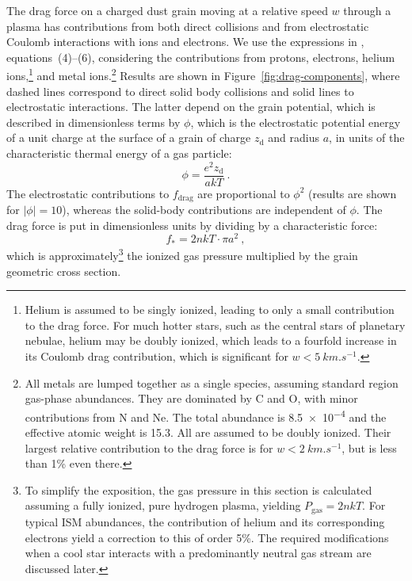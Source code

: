 \message{ !name(dusty-bow-wave.tex)}\documentclass[useAMS, usenatbib, a4paper]{mnras}
\providecommand{\abs}[1]{\lvert#1\rvert}
\newcommand{\grain}{\ensuremath{_{\text{d}}}}
\newcommand\drag{\ensuremath{_{\text{drag}}}}
\newcommand{\gas}{\ensuremath{_{\text{gas}}}}
\begin{document}
The drag force on a charged dust grain moving at a relative speed
\(w\) through a plasma has contributions from both direct collisions
and from electrostatic Coulomb interactions with ions and electrons.
We use the expressions in \citet{Draine:1979a}, equations~(4)--(6),
considering the contributions from protons, electrons, helium
ions,\footnote{Helium is assumed to be singly ionized, leading to only
  a small contribution to the drag force.  For much hotter stars, such
  as the central stars of planetary nebulae, helium may be doubly
  ionized, which leads to a fourfold increase in its Coulomb drag
  contribution, which is significant for \(w < \SI{5}{km.s^{-1}}\).} %
and metal ions.\footnote{%
  \label{fn:metal-drag}
  All metals are lumped together as a single species, assuming
  standard \hii{} region gas-phase abundances.  They are dominated by
  C and O, with minor contributions from N and Ne.  The total
  abundance is \num{8.5e-4} and the effective atomic weight is
  \num{15.3}.  All are assumed to be doubly ionized.  Their largest
  relative contribution to the drag force is for
  \(w < \SI{2}{km.s^{-1}}\), but is less than 1\% even there.} %
Results are shown in Figure~\ref{fig:drag-components}, where dashed
lines correspond to direct solid body collisions and solid lines to
electrostatic interactions.  The latter depend on the grain potential,
which is described in dimensionless terms by \(\phi\), which is the
electrostatic potential energy of a unit charge at the surface of a
grain of charge \(z\grain\) and radius \(a\), in units of the
characteristic thermal energy of a gas particle:
\begin{equation}
  \label{eq:phi-potential}
  \phi = \frac{e^2 z\grain}{a kT} \ .
\end{equation}
The electrostatic contributions to \(f\drag\) are proportional to
\(\phi^2\) (results are shown for \(\abs{\phi} = 10\)), whereas the
solid-body contributions are independent of \(\phi\).  The drag force is
put in dimensionless units by dividing by a characteristic force:
\begin{equation}
  \label{eq:fstar}
  f_* = 2 n k T \cdot \pi a^2 \ , 
\end{equation}
which is approximately\footnote{%
  To simplify the exposition, the gas pressure in this section is
  calculated assuming a fully ionized, pure hydrogen plasma, yielding
  \(P\gas = 2 n k T\). For typical ISM abundances, the contribution of
  helium and its corresponding electrons yield a correction to this of
  order 5\%.  The required modifications when a cool star interacts
  with a predominantly neutral gas stream are discussed later.  } %
the ionized gas pressure multiplied by the grain geometric cross
section.
\end{document}

